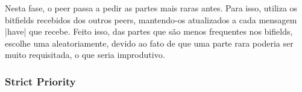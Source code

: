 Nesta fase, o \gls*{peer} passa a pedir as partes mais raras antes. Para isso, utiliza
os bitfields recebidos dos outros \glspl*{peer}, mantendo-os atualizados a cada mensagem
\bverb|have| que recebe. Feito isso, das partes que são menos frequentes nos bifields,
escolhe uma aleatoriamente, devido ao fato de que uma parte rara poderia ser muito
requisitada, o que seria improdutivo.

\begin{comment}
When selecting which piece to start downloading
next, peers generally download pieces which the
fewest of their own peers have first, a technique we
refer to as ’rarest first’. This technique does a good
job of making sure that peers have pieces which all
of their peers want, so uploading can be done when
wanted. It also makes sure that pieces which are
more common are left for later, so the likelihood that
a peer which currently is offering upload will later
not have anything of interest is reduced.
Information theory dictates that no downloaders
can complete until every part of the file has been up-
loaded by the seed. For deployments with a single
seed whose upload capacity is considerably less than
that of many downloaders, performance is much bet-
ter if different downloaders get different pieces from
the seed, since redundant downloads waste the op-
portunity for the seed to get more information out.
Rarest first does a good job of only downloading new
pieces from the seed, since downloaders will be able
to see that their other peers have pieces the seed has
uploaded already.
For some deployments the original seed is eventu-
ally taken down for cost reasons, leaving only current
downloaders to upload. This leads to a very signifi-
cant risk of a particular piece no longer being avail-
able from any current downloaders. Rarest first again
handles this well, by replicating the rarest pieces as
quickly as possible thus reducing the risk of them get-
ting completely lost as current peers stop uploading.
\end{comment}

\subsubsection*{Strict Priority}

\begin{comment}
BitTorrent’s first policy for piece selection is that
once a single sub-piece has been requested, the re-
maining sub-pieces from that particular piece are re-
quested before sub-pieces from any other piece. This
does a good job of getting complete pieces as quickly
as possible.
\end{comment}

